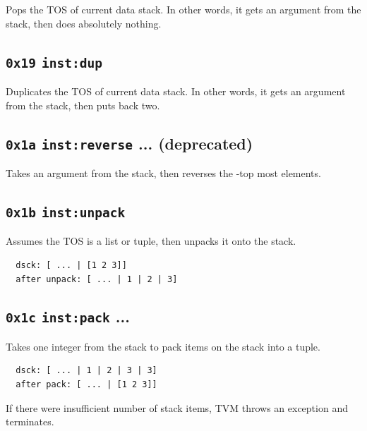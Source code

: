 \documentclass{report}
\newcommand{\inst}[1] {\texttt{inst:#1}}
\begin{document}
Pops the TOS of current data stack. In other words, it gets an argument from the stack, then does absolutely nothing.

\subsection{\texttt{0x19} \inst{dup} }

Duplicates the TOS of current data stack. In other words, it gets an argument from the stack, then puts back two.

\subsection{\texttt{0x1a} \inst{reverse}    ...  (deprecated)}

Takes an argument from the stack, then reverses the -top most elements.

\subsection{\texttt{0x1b} \inst{unpack} }

Assumes the TOS is a list or tuple, then unpacks it onto the stack.

\begin{mdframed}[style=example]
\begin{verbatim}
  dsck: [ ... | [1 2 3]]
  after unpack: [ ... | 1 | 2 | 3]
\end{verbatim}
\end{mdframed}
\subsection{\texttt{0x1c} \inst{pack}    ... }

Takes one integer  from the stack to pack  items on the stack into a tuple.

\begin{mdframed}[style=example]
\begin{verbatim}
  dsck: [ ... | 1 | 2 | 3 | 3]
  after pack: [ ... | [1 2 3]]
\end{verbatim}
\end{mdframed}

\begin{mdframed}[style=hint]
  If there were insufficient number of stack items, TVM throws an
  exception and terminates.
\end{mdframed}
\end{document}

